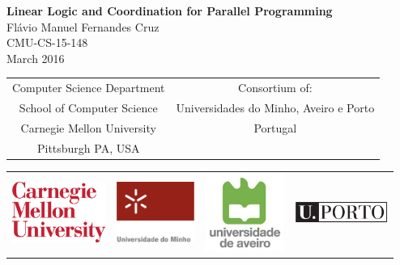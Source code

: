 

\begin{center}
{\huge \bf 
   Linear Logic and Coordination for Parallel Programming
}
\vspace{.25in}
{\LARGE
\\Fl\'{a}vio Manuel Fernandes Cruz\\}
\vspace{.25in}
{\large 
  CMU-CS-15-148
\\ March 2016 \\}
 \vspace{.5in}

\setlength{\tabcolsep}{2em}
{\large
\begin{tabular}{cc}
\\ Computer Science Department & Consortium of:   \\
School of Computer Science & Universidades do Minho,  Aveiro e Porto \\
Carnegie Mellon University & Portugal \\
Pittsburgh PA, USA &  \\
\end{tabular}
}

\begin{tabular}{cccc}
\\ \includegraphics[width=1.2in]{logos/cmu.eps} & \includegraphics[width=1.0in]{logos/um.jpg}  & \includegraphics[width=1.0in]{logos/ua.jpg} & \includegraphics[width=1.2in]{logos/up.eps} \\
\end{tabular}


\end{center}
